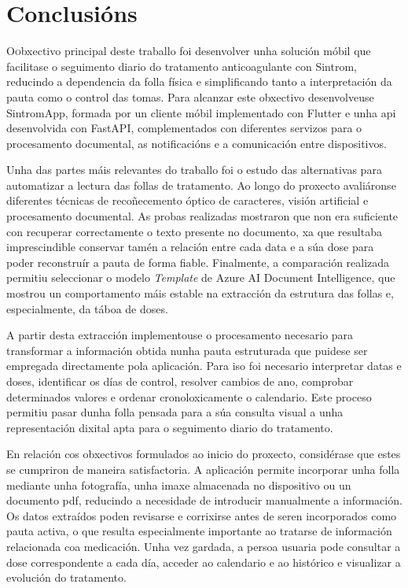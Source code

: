 \chapter{Conclusións}
\label{chap:conclusions}

\lettrine{O} obxectivo principal deste traballo foi desenvolver unha solución móbil que facilitase o seguimento diario do tratamento anticoagulante con Sintrom, reducindo a dependencia da folla física e simplificando tanto a interpretación da pauta como o control das tomas. Para alcanzar este obxectivo desenvolveuse SintromApp, formada por un cliente móbil implementado con Flutter e unha \gls{api} desenvolvida con FastAPI, complementados con diferentes servizos para o procesamento documental, as notificacións e a comunicación entre dispositivos.

Unha das partes máis relevantes do traballo foi o estudo das alternativas para automatizar a lectura das follas de tratamento. Ao longo do proxecto avaliáronse diferentes técnicas de recoñecemento óptico de caracteres, visión artificial e procesamento documental. As probas realizadas mostraron que non era suficiente con recuperar correctamente o texto presente no documento, xa que resultaba imprescindible conservar tamén a relación entre cada data e a súa dose para poder reconstruír a pauta de forma fiable. Finalmente, a comparación realizada permitiu seleccionar o modelo \textit{Template} de Azure AI Document Intelligence, que mostrou un comportamento máis estable na extracción da estrutura das follas e, especialmente, da táboa de doses.

A partir desta extracción implementouse o procesamento necesario para transformar a información obtida nunha pauta estruturada que puidese ser empregada directamente pola aplicación. Para iso foi necesario interpretar datas e doses, identificar os días de control, resolver cambios de ano, comprobar determinados valores e ordenar cronoloxicamente o calendario. Este proceso permitiu pasar dunha folla pensada para a súa consulta visual a unha representación dixital apta para o seguimento diario do tratamento.

En relación cos obxectivos formulados ao inicio do proxecto, considérase que estes se cumpriron de maneira satisfactoria. A aplicación permite incorporar unha folla mediante unha fotografía, unha imaxe almacenada no dispositivo ou un documento \gls{pdf}, reducindo a necesidade de introducir manualmente a información. Os datos extraídos poden revisarse e corrixirse antes de seren incorporados como pauta activa, o que resulta especialmente importante ao tratarse de información relacionada coa medicación. Unha vez gardada, a persoa usuaria pode consultar a dose correspondente a cada día, acceder ao calendario e ao histórico e visualizar a evolución do tratamento.

